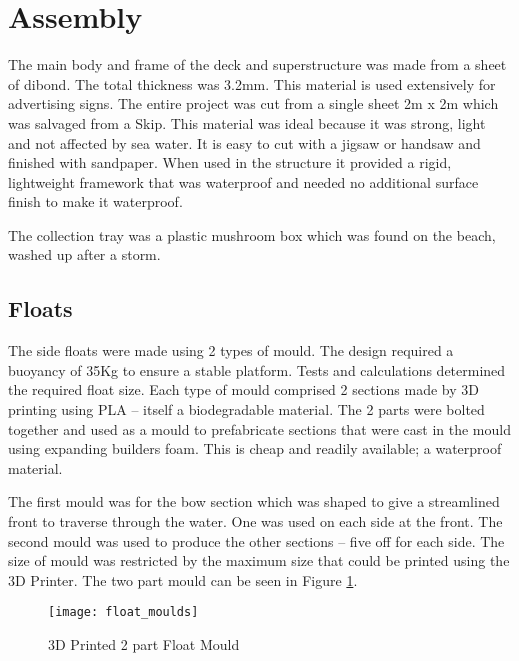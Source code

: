 \documentclass [11pt]{article}
\begin{document}
\section{Assembly}

The main body and frame of the deck and superstructure was made from a sheet of \gls{dibond}. The total thickness was 3.2mm. This material is used extensively for advertising signs. The entire project was cut from a single sheet 2m x 2m which was salvaged from a Skip. This material was ideal because it was strong, light and not affected by sea water. It is easy to cut with a jigsaw or handsaw and finished with sandpaper. When used in the structure it provided a rigid, lightweight framework that was waterproof and needed no additional surface finish to make it waterproof.

The collection tray was a plastic mushroom box which was found on the beach, washed up after a storm.

\subsection{Floats}

The side floats were made using 2 types of mould. The design required a buoyancy of 35Kg to ensure a stable platform. Tests and calculations determined the required float size.
Each type of mould comprised 2 sections made by 3D printing using PLA – itself a biodegradable material. The 2 parts were bolted together and used as a mould to prefabricate sections that were cast in the mould using expanding builders foam. This is cheap and readily available; a waterproof material.

The first mould was for the bow section which was shaped to give a streamlined front to traverse through the water. One was used on each side at the front.  The second mould was used to produce the other sections – five off for each side. The size of mould was restricted by the maximum size that could be printed using the 3D Printer. The two part mould can be seen in Figure \ref{fig:float_moulds}.

\begin{figure}[H]
\centerline{\texttt{[image: float\_moulds]}}
\caption{3D Printed 2 part Float Mould}
\label{fig:float_moulds}
\end{figure}
\end{document}
